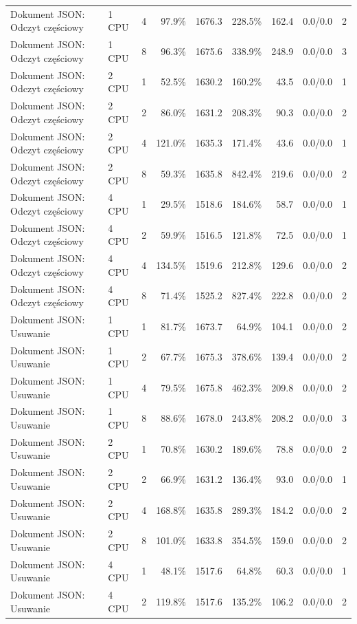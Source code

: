 \begin{table}[ht]
{\begin{tabular}{llcrrrrcc}
Dokument JSON: Odczyt częściowy & 1 CPU & 4 & 97.9\% & 1676.3 & 228.5\% & 162.4 & 0.0/0.0 & 2 \\
Dokument JSON: Odczyt częściowy & 1 CPU & 8 & 96.3\% & 1675.6 & 338.9\% & 248.9 & 0.0/0.0 & 3 \\
Dokument JSON: Odczyt częściowy & 2 CPU & 1 & 52.5\% & 1630.2 & 160.2\% & 43.5 & 0.0/0.0 & 1 \\
Dokument JSON: Odczyt częściowy & 2 CPU & 2 & 86.0\% & 1631.2 & 208.3\% & 90.3 & 0.0/0.0 & 2 \\
Dokument JSON: Odczyt częściowy & 2 CPU & 4 & 121.0\% & 1635.3 & 171.4\% & 43.6 & 0.0/0.0 & 1 \\
Dokument JSON: Odczyt częściowy & 2 CPU & 8 & 59.3\% & 1635.8 & 842.4\% & 219.6 & 0.0/0.0 & 2 \\
Dokument JSON: Odczyt częściowy & 4 CPU & 1 & 29.5\% & 1518.6 & 184.6\% & 58.7 & 0.0/0.0 & 1 \\
Dokument JSON: Odczyt częściowy & 4 CPU & 2 & 59.9\% & 1516.5 & 121.8\% & 72.5 & 0.0/0.0 & 1 \\
Dokument JSON: Odczyt częściowy & 4 CPU & 4 & 134.5\% & 1519.6 & 212.8\% & 129.6 & 0.0/0.0 & 2 \\
Dokument JSON: Odczyt częściowy & 4 CPU & 8 & 71.4\% & 1525.2 & 827.4\% & 222.8 & 0.0/0.0 & 2 \\
Dokument JSON: Usuwanie & 1 CPU & 1 & 81.7\% & 1673.7 & 64.9\% & 104.1 & 0.0/0.0 & 2 \\
Dokument JSON: Usuwanie & 1 CPU & 2 & 67.7\% & 1675.3 & 378.6\% & 139.4 & 0.0/0.0 & 2 \\
Dokument JSON: Usuwanie & 1 CPU & 4 & 79.5\% & 1675.8 & 462.3\% & 209.8 & 0.0/0.0 & 2 \\
Dokument JSON: Usuwanie & 1 CPU & 8 & 88.6\% & 1678.0 & 243.8\% & 208.2 & 0.0/0.0 & 3 \\
Dokument JSON: Usuwanie & 2 CPU & 1 & 70.8\% & 1630.2 & 189.6\% & 78.8 & 0.0/0.0 & 2 \\
Dokument JSON: Usuwanie & 2 CPU & 2 & 66.9\% & 1631.2 & 136.4\% & 93.0 & 0.0/0.0 & 1 \\
Dokument JSON: Usuwanie & 2 CPU & 4 & 168.8\% & 1635.8 & 289.3\% & 184.2 & 0.0/0.0 & 2 \\
Dokument JSON: Usuwanie & 2 CPU & 8 & 101.0\% & 1633.8 & 354.5\% & 159.0 & 0.0/0.0 & 2 \\
Dokument JSON: Usuwanie & 4 CPU & 1 & 48.1\% & 1517.6 & 64.8\% & 60.3 & 0.0/0.0 & 1 \\
Dokument JSON: Usuwanie & 4 CPU & 2 & 119.8\% & 1517.6 & 135.2\% & 106.2 & 0.0/0.0 & 2 \\

\end{tabular}}
\end{table}
